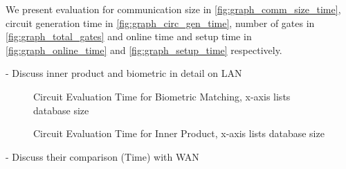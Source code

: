 We present evaluation for communication size in \cref{fig:graph_comm_size_time}, circuit generation time in \cref{fig:graph_circ_gen_time}, number of gates in \cref{fig:graph_total_gates} and online time and setup time in \cref{fig:graph_online_time} and \cref{fig:graph_setup_time} respectively. 

- Discuss inner product and biometric in detail on LAN


\begin{figure}[htbp]
\centering
\resizebox{3.6in}{!}{}
\caption{Circuit Evaluation Time for Biometric Matching, x-axis lists database size}
\label{fig:graph_biometric_eval_time}
\end{figure}

\begin{figure}[htbp]
\centering
\resizebox{3.6in}{!}{}
\caption{Circuit Evaluation Time for Inner Product, x-axis lists database size}
\label{fig:graph_inner_product_eval_time}
\end{figure}

- Discuss their comparison (Time) with WAN

\begin{figure*}[htbp]
\centering

\caption{Communication Size of Benchmarks}
\label{fig:graph_comm_size_time}
\end{figure*}


\begin{figure*}[htbp]
\centering

\caption{Circuit Generation Time of Benchmarks}
\label{fig:graph_circ_gen_time}
\end{figure*}

\begin{figure*}[htbp]
\centering

\caption{Number of Gates of Benchmarks}
\label{fig:graph_total_gates}
\end{figure*}

\begin{figure*}[htbp]
\centering

\caption{Online Time of Benchmarks}
\label{fig:graph_online_time}
\end{figure*}

\begin{figure*}[htbp]
\centering

\caption{Setup Time of Benchmarks}
\label{fig:graph_setup_time}
\end{figure*}


